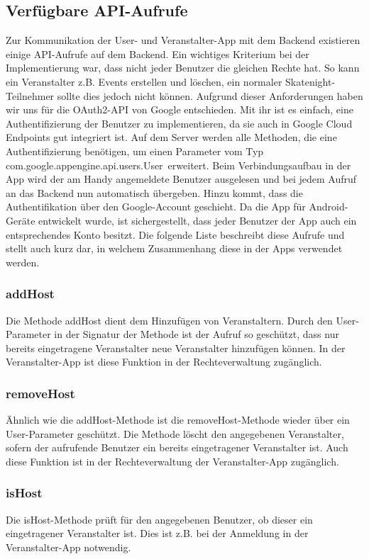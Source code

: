 \subsection{Verfügbare API-Aufrufe}
Zur Kommunikation der User- und Veranstalter-App mit dem Backend existieren einige API-Aufrufe auf dem Backend. Ein wichtiges Kriterium bei der Implementierung war, dass nicht jeder Benutzer die gleichen Rechte hat. So kann ein Veranstalter z.B. Events erstellen und löschen, ein normaler Skatenight-Teilnehmer sollte dies jedoch nicht können. Aufgrund dieser Anforderungen haben wir uns für die OAuth2-API von Google entschieden. Mit ihr ist es einfach, eine Authentifizierung der Benutzer zu implementieren, da sie auch in Google Cloud Endpoints gut integriert ist. Auf dem Server werden alle Methoden, die eine Authentifizierung benötigen, um einen Parameter vom Typ \glqq com.google.appengine.api.users.User\grqq\ erweitert. Beim Verbindungsaufbau in der App wird der am Handy angemeldete Benutzer ausgelesen und bei jedem Aufruf an das Backend nun automatisch übergeben. Hinzu kommt, dass die Authentifikation über den Google-Account geschieht. Da die App für Android-Geräte entwickelt wurde, ist sichergestellt, dass jeder Benutzer der App auch ein entsprechendes Konto besitzt.
Die folgende Liste beschreibt diese Aufrufe und stellt auch kurz dar, in welchem Zusammenhang diese in der Apps verwendet werden.

\subsubsection*{addHost}
Die Methode addHost dient dem Hinzufügen von Veranstaltern. Durch den User-Parameter in der Signatur der Methode ist der Aufruf so geschützt, dass nur bereits eingetragene Veranstalter neue Veranstalter hinzufügen können. In der Veranstalter-App ist diese Funktion in der Rechteverwaltung zugänglich.

\subsubsection*{removeHost}
Ähnlich wie die addHost-Methode ist die removeHost-Methode wieder über ein User-Parameter geschützt. Die Methode löscht den angegebenen Veranstalter, sofern der aufrufende Benutzer ein bereits eingetragener Veranstalter ist. Auch diese Funktion ist in der Rechteverwaltung der Veranstalter-App zugänglich.

\subsubsection*{isHost}
Die isHost-Methode prüft für den angegebenen Benutzer, ob dieser ein eingetragener Veranstalter ist. Dies ist z.B. bei der Anmeldung in der Veranstalter-App notwendig.

